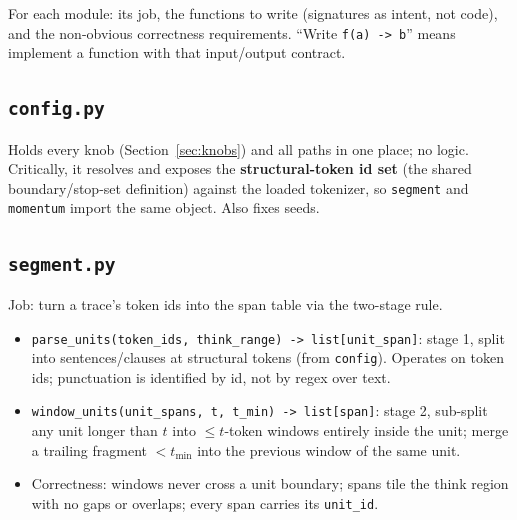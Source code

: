\documentclass[11pt]{article}
\newcommand{\modu}[1]{\texttt{#1}}
\newcommand{\fn}[1]{\texttt{#1}}
\begin{document}
For each module: its job, the functions to write (signatures as intent, not code), and the non-obvious correctness requirements. ``Write \fn{f(a) -> b}'' means implement a function with that input/output contract.

\subsection{\modu{config.py}}
Holds every knob (Section~\ref{sec:knobs}) and all paths in one place; no logic. Critically, it resolves and exposes the \textbf{structural-token id set} (the shared boundary/stop-set definition) against the loaded tokenizer, so \modu{segment} and \modu{momentum} import the same object. Also fixes seeds.

\subsection{\modu{segment.py}}
Job: turn a trace's token ids into the span table via the two-stage rule.
\begin{itemize}[leftmargin=1.5em]
  \item \fn{parse\_units(token\_ids, think\_range) -> list[unit\_span]}: stage 1, split into sentences/clauses at structural tokens (from \modu{config}). Operates on token ids; punctuation is identified by id, not by regex over text.
  \item \fn{window\_units(unit\_spans, t, t\_min) -> list[span]}: stage 2, sub-split any unit longer than $t$ into $\le t$-token windows entirely inside the unit; merge a trailing fragment $< t_{\min}$ into the previous window of the same unit.
  \item Correctness: windows never cross a unit boundary; spans tile the think region with no gaps or overlaps; every span carries its \texttt{unit\_id}.
\end{itemize}
\end{document}
